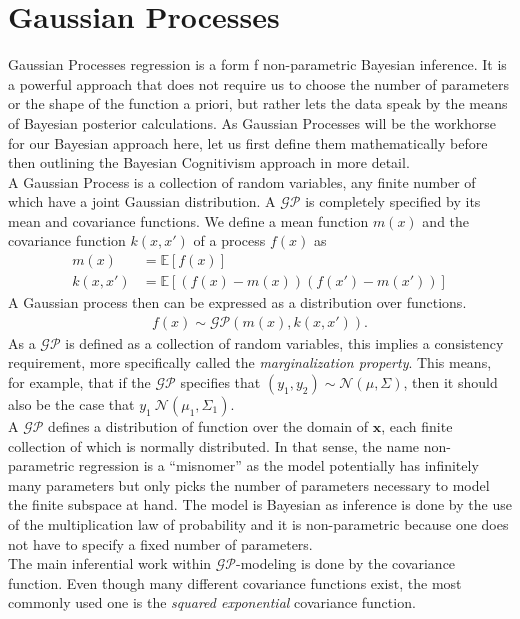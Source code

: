 \documentclass[oneside, 11pt]{book}
\begin{document}
\section{Gaussian Processes}
Gaussian Processes regression is a form f non-parametric Bayesian inference. It is a powerful approach that does not require us to choose the number of parameters or the shape of the function a priori, but rather lets the data speak by the means of Bayesian posterior calculations. As Gaussian Processes will be the workhorse for our Bayesian approach here, let us first define them mathematically before then outlining the Bayesian Cognitivism approach in more detail.\\
A Gaussian Process is a collection of random variables, any finite number of which have a joint Gaussian distribution. A $\mathcal{GP}$ is completely specified by its mean and covariance functions. We define a mean function $m(x)$ and the covariance function $k(x,x')$ of a process $f(x)$ as
\begin{align}
m(x)&=\mathbb{E}[f(x)]\\
k(x,x')&=\mathbb{E}[(f(x)-m(x))(f(x')-m(x'))]
\end{align}
A Gaussian process then can be expressed as a distribution over functions.
\begin{align}
f(x) \sim \mathcal{GP}\left(m(x),k(x,x')\right).
\end{align}
As a $\mathcal{GP}$ is defined as a collection of random variables, this implies a consistency requirement, more specifically called the \emph{marginalization property}. This means, for example, that if the $\mathcal{GP}$ specifies that $(y_1,y_2) \sim \mathcal{N}(\mu, \Sigma)$, then it should also be the case that $y_1~\mathcal{N}(\mu_1,\Sigma_1)$.\\
A $\mathcal{GP}$ defines a distribution of function over the domain of $\mathbf{x}$, each finite collection of which is normally distributed. In that sense, the name non-parametric regression is a ``misnomer'' as the model potentially has infinitely many parameters but only picks the number of parameters necessary to model the finite subspace at hand. The model is Bayesian as inference is done by the use of the multiplication law of probability and it is non-parametric because one does not have to specify a fixed number of parameters.\\
The main inferential work within $\mathcal{GP}$-modeling is done by the covariance function. Even though many different covariance functions exist, the most commonly used one is the \emph{squared exponential} covariance function.
\end{document}
